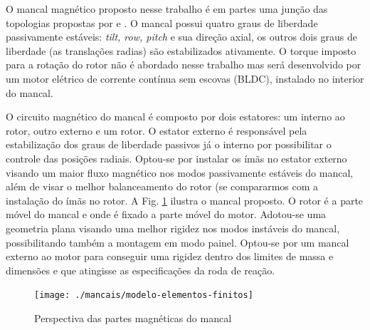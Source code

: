 
O mancal magnético proposto nesse trabalho é em partes uma junção das topologias propostas por \citet{Bernus1998} e \citet{Scharfe2001}. O mancal possui quatro graus de liberdade passivamente estáveis: \textit{tilt, row, pitch} e sua direção axial, os outros dois graus de liberdade (as translações radias) são estabilizados ativamente. O torque imposto para a rotação do rotor não é abordado nesse trabalho mas será desenvolvido por um motor elétrico de corrente contínua sem escovas (BLDC), instalado no interior do mancal.

O circuito magnético do mancal é composto por dois estatores: um interno ao rotor, outro externo e um rotor. O estator externo é responsável pela estabilização dos graus de liberdade passivos já o interno por possibilitar o controle das posições radiais. Optou-se por instalar os ímãs no estator externo visando um maior fluxo magnético nos modos passivamente estáveis do mancal, além de visar o melhor balanceamento do rotor (se compararmos com a instalação do ímãs no rotor. A Fig. \ref{fig:mancal:topo} ilustra o mancal proposto. O rotor é a parte móvel do mancal e onde é fixado a parte móvel do motor. Adotou-se uma geometria plana visando uma melhor rigidez nos modos instáveis do mancal, possibilitando também a montagem em modo painel. Optou-se por um mancal externo ao motor  para conseguir uma rigidez dentro dos limites de massa e dimensões e que atingisse as especificações  da roda de reação. 

\begin{figure}[ht!]
\centering
\texttt{[image: ./mancais/modelo-elementos-finitos]}
\caption[Corte ilustrativo do mancal magnético]{Perspectiva das partes magnéticas do mancal}
\label{fig:mancal:topo}
\end{figure}

